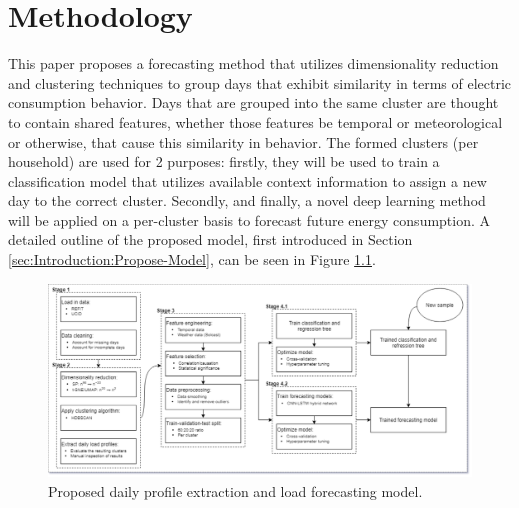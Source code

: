 \chapter{Methodology}
\label{ch:Methodology}
This paper proposes a forecasting method that utilizes dimensionality reduction and clustering techniques to group days that exhibit similarity in terms of electric consumption behavior. Days that are grouped into the same cluster are thought to contain shared features, whether those features be temporal or meteorological or otherwise, that cause this similarity in behavior. The formed clusters (per household) are used for 2 purposes: firstly, they will be used to train a classification model that utilizes available context information to assign a new day to the correct cluster. Secondly, and finally, a novel deep learning method will be applied on a per-cluster basis to forecast future energy consumption. A detailed outline of the proposed model, first introduced in Section \ref{sec:Introduction:Propose-Model},  can be seen in Figure \ref{fig:Proposed-Model}.

\begin{figure}[H]
    \begin{adjustwidth}{-3.0cm}{-3.0cm}%
        \centering
        \includegraphics[width=\linewidth]{Images/Chapter 5/Other/Proposed-Model.pdf}
        \caption{Proposed daily profile extraction and load forecasting model.}
        \label{fig:Proposed-Model}
    \end{adjustwidth}
\end{figure}

